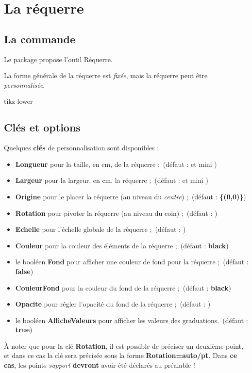 \documentclass[french,a4paper,11pt]{article}
\newcommand\Cle[1]{{\bfseries\sffamily\textlangle #1\textrangle}}
\begin{document}
\pagebreak

\section{La réquerre}

\subsection{La commande}

\begin{cautionblock}
Le package propose l'outil \textsf{Réquerre}.

La forme générale de la réquerre est \textit{fixée}, mais la réquerre peut être \textit{personnalisée}.
\end{cautionblock}

\begin{PresentationCode}{tikz lower}
\tkzRequerre
\end{PresentationCode}

\subsection{Clés et options}

\begin{tipblock}
Quelques \Cle{clés} de personnalisation sont disponibles :

\begin{itemize}
	\item \Cle{Longueur} pour la taille, en cm, de la réquerre ;\hfill~(défaut : \Cle{12} et mini \Cle{6})
	\item \Cle{Largeur} pour la largeur, en cm, la réquerre ;\hfill~(défaut : \Cle{3} et mini \Cle{1.5})
	\item \Cle{Origine} pour le placer la réquerre (au niveau du \textit{centre}) ;\hfill~(défaut : \Cle{\{(0,0)\}})
	\item \Cle{Rotation} pour pivoter la réquerre (au niveau du coin) ;\hfill~(défaut : \Cle{0})
	\item \Cle{Echelle} pour l'échelle globale de la réquerre ;\hfill~(défaut : \Cle{1})
	\item \Cle{Couleur} pour la couleur des éléments de la réquerre ;\hfill~(défaut : \Cle{black})
	\item le booléen \Cle{Fond} pour afficher une couleur de fond pour la réquerre ;\hfill~(défaut : \Cle{false})
	\item \Cle{CouleurFond} pour la couleur du fond de la réquerre ;\hfill~(défaut : \Cle{black})
	\item \Cle{Opacite} pour régler l'opacité du fond de la réquerre ;\hfill~(défaut : \Cle{0.5})
	\item le booléen \Cle{AfficheValeurs} pour afficher les valeurs des graduations.\hfill~(défaut : \Cle{true})
\end{itemize}

À noter que pour la clé \Cle{Rotation}, il est possible de préciser un deuxième point, et dans ce cas la clé sera précisée sous la forme \Cle{Rotation=auto/pt}. Dans \textbf{ce cas}, les points \textit{support} \textbf{devront} avoir été déclarés au préalable !
\end{tipblock}
\end{document}

